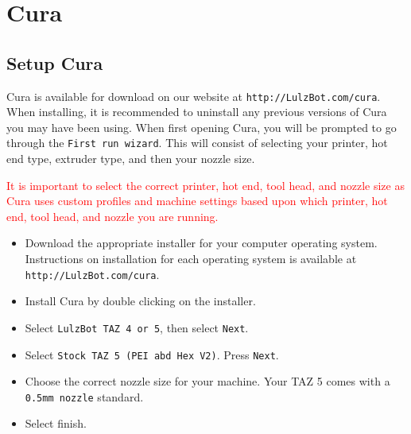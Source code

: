 %
%
%
%
%

\section{Cura}
\label{Cura}

\subsection{Setup Cura}
Cura is available for download on our website at \texttt{http://LulzBot.com/cura}. When installing, it is recommended to uninstall any previous versions of Cura you may have been using. 
When first opening Cura, you will be prompted to go through the \texttt{First run wizard}. This will consist of selecting your printer, hot end type, extruder type, and then your nozzle size.

\textcolor{red}{It is important to select the correct printer, hot end, tool head, and nozzle size as Cura uses custom profiles and machine settings based upon which printer, hot end, tool head, and nozzle you are running.}

\begin{itemize}
\item Download the appropriate installer for your computer operating system. Instructions on installation for each operating system is available at \texttt{http://LulzBot.com/cura}.
\item Install Cura by double clicking on the installer.
\item Select \texttt{LulzBot TAZ 4 or 5}, then select \texttt{Next}.
\item Select \texttt{Stock TAZ 5 (PEI abd Hex V2)}. Press \texttt{Next}.
\item Choose the correct nozzle size for your machine. Your TAZ 5 comes with a \texttt{0.5mm nozzle} standard.
\item Select finish.
\end{itemize}



